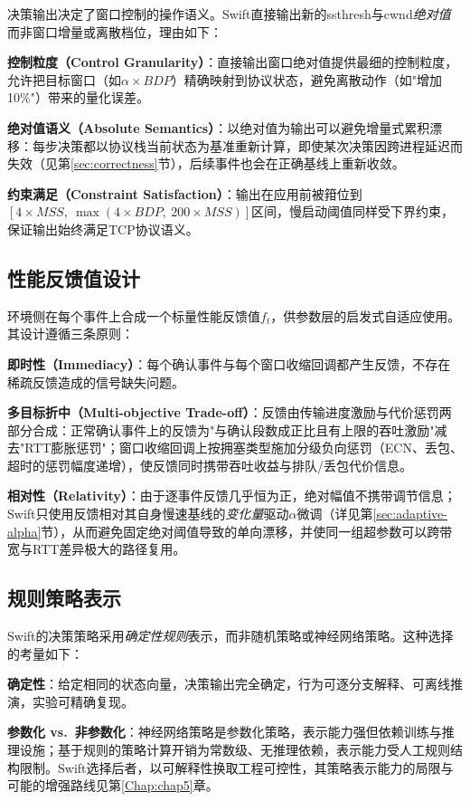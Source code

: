 决策输出决定了窗口控制的操作语义。Swift直接输出新的ssthresh与cwnd\emph{绝对值}而非窗口增量或离散档位，理由如下：

\textbf{控制粒度（Control Granularity）}：直接输出窗口绝对值提供最细的控制粒度，允许把目标窗口（如$\alpha \times BDP$）精确映射到协议状态，避免离散动作（如"增加10\%"）带来的量化误差。

\textbf{绝对值语义（Absolute Semantics）}：以绝对值为输出可以避免增量式累积漂移：每步决策都以协议栈当前状态为基准重新计算，即使某次决策因跨进程延迟而失效（见第\ref{sec:correctness}节），后续事件也会在正确基线上重新收敛。

\textbf{约束满足（Constraint Satisfaction）}：输出在应用前被箝位到$[4 \times MSS,\ \max(4 \times BDP,\ 200 \times MSS)]$区间，慢启动阈值同样受下界约束，保证输出始终满足TCP协议语义。

\subsection{性能反馈值设计}

环境侧在每个事件上合成一个标量性能反馈值$f_t$，供参数层的启发式自适应使用。其设计遵循三条原则：

\textbf{即时性（Immediacy）}：每个确认事件与每个窗口收缩回调都产生反馈，不存在稀疏反馈造成的信号缺失问题。

\textbf{多目标折中（Multi-objective Trade-off）}：反馈由传输进度激励与代价惩罚两部分合成：正常确认事件上的反馈为"与确认段数成正比且有上限的吞吐激励"减去"RTT膨胀惩罚"；窗口收缩回调上按拥塞类型施加分级负向惩罚（ECN、丢包、超时的惩罚幅度递增），使反馈同时携带吞吐收益与排队/丢包代价信息。

\textbf{相对性（Relativity）}：由于逐事件反馈几乎恒为正，绝对幅值不携带调节信息；Swift只使用反馈相对其自身慢速基线的\emph{变化量}驱动$\alpha$微调（详见第\ref{sec:adaptive-alpha}节），从而避免固定绝对阈值导致的单向漂移，并使同一组超参数可以跨带宽与RTT差异极大的路径复用。

\subsection{规则策略表示}

Swift的决策策略采用\emph{确定性规则}表示，而非随机策略或神经网络策略。这种选择的考量如下：

\textbf{确定性}：给定相同的状态向量，决策输出完全确定，行为可逐分支解释、可离线推演，实验可精确复现。

\textbf{参数化 vs.\ 非参数化}：神经网络策略是参数化策略，表示能力强但依赖训练与推理设施；基于规则的策略计算开销为常数级、无推理依赖，表示能力受人工规则结构限制。Swift选择后者，以可解释性换取工程可控性，其策略表示能力的局限与可能的增强路线见第\ref{Chap:chap5}章。

